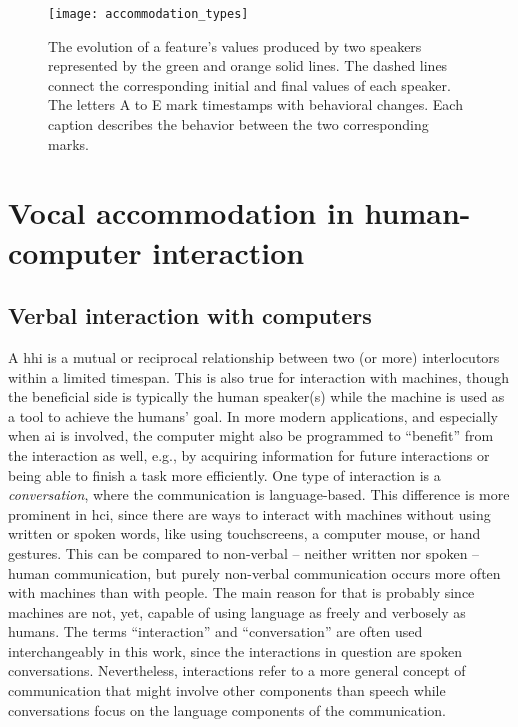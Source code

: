 \begin{figure}[t]
	\centering
	\texttt{[image: accommodation\_types]}
	\caption[Different accommodation types in a conversation]
		{The evolution of a feature's values produced by two speakers represented by the green and orange solid lines.
		The dashed lines connect the corresponding initial and final values of each speaker.
		The letters A to E mark timestamps with behavioral changes.
		Each caption describes the behavior between the two corresponding marks.}
	\label{fig:accommodation_types}
\end{figure}

\section{Vocal accommodation in human-computer interaction}
\label{sec:phonetic_convergence_in_hci}


\subsection{Verbal interaction with computers}
\label{subsec:verbal_interaction}

A \acf{hhi} is a mutual or reciprocal relationship between two (or more) interlocutors within a limited timespan.
This is also true for interaction with machines, though the beneficial side is typically the human speaker(s) while the machine is used as a tool to achieve the humans' goal.
In more modern applications, and especially when \ac{ai} is involved, the computer might also be programmed to \enquote{benefit} from the interaction as well, e.g., by acquiring information for future interactions or being able to finish a task more efficiently.
One type of interaction is a \emph{conversation}, where the communication is language-based.
This difference is more prominent in \ac{hci}, since there are ways to interact with machines without using written or spoken words, like using touchscreens, a computer mouse, or hand gestures.
This can be compared to non-verbal -- neither written nor spoken -- human communication, but purely non-verbal communication occurs more often with machines than with people.
The main reason for that is probably since machines are not, yet, capable of using language as freely and verbosely as humans.
The terms \enquote{interaction} and \enquote{conversation} are often used interchangeably in this work, since the interactions in question are spoken conversations.
Nevertheless, interactions refer to a more general concept of communication that might involve other components than speech while conversations focus on the language components of the communication.

